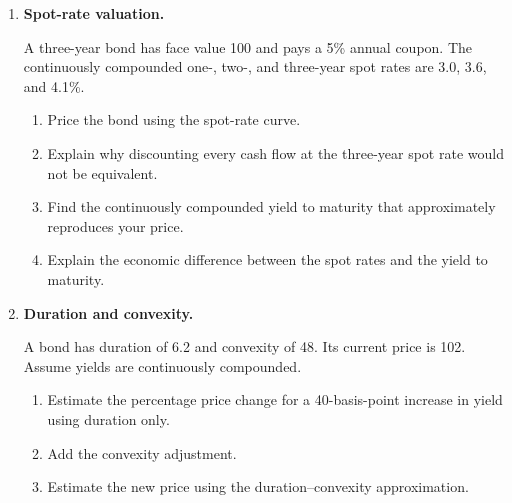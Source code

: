 \begin{enumerate}
\begin{enumerate}
\item Calculate its price if the continuously compounded yield to maturity is 3\%.

\item Recalculate the price at a continuously compounded yield of 5\%.

\item Identify whether the bond trades at a premium or discount in each case.

\item Verify that the direction of the price change is consistent with the price--yield relation.

\end{enumerate}

\item \textbf{Spot-rate valuation.}

A three-year bond has face value 100 and pays a 5\% annual coupon. The continuously compounded one-, two-, and three-year spot rates are 3.0, 3.6, and 4.1\%.

\begin{enumerate}

\item Price the bond using the spot-rate curve.

\item Explain why discounting every cash flow at the three-year spot rate would not be equivalent.

\item Find the continuously compounded yield to maturity that approximately reproduces your price.

\item Explain the economic difference between the spot rates and the yield to maturity.

\end{enumerate}

\item \textbf{Duration and convexity.}

A bond has duration of 6.2 and convexity of 48. Its current price is 102. Assume yields are continuously compounded.

\begin{enumerate}

\item Estimate the percentage price change for a 40-basis-point increase in yield using duration only.

\item Add the convexity adjustment.

\item Estimate the new price using the duration--convexity approximation.


\end{enumerate}
\end{enumerate}
